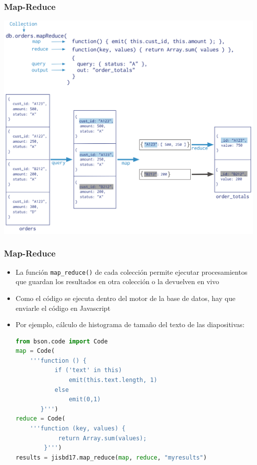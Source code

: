 \documentclass[14pt]{beamer}
\begin{document}
\begin{frame}
\begin{itemize}
\begin{frame}
  \frametitle{Map-Reduce}
  \centering\includegraphics[height=.85\textheight]{img/mongo-map-reduce}
\end{frame}

\begin{frame}
  \frametitle{Map-Reduce}
  \begin{itemize}
  \item La función {\tt map\_reduce()} de cada colección permite ejecutar
    procesamientos que guardan los resultados en otra colección o la
    devuelven en vivo
  \item Como el código se ejecuta dentro del motor de la base de datos, hay
    que enviarle el código en Javascript
  \item Por ejemplo, cálculo de histograma de tamaño del texto de las
    diapositivas:
\framebreak
\begin{lstlisting}[language=Python]
from bson.code import Code
map = Code(
    '''function () {
           if ('text' in this)
               emit(this.text.length, 1)
           else
               emit(0,1)
       }''')
reduce = Code(
    '''function (key, values) {
            return Array.sum(values);
        }''')
results = jisbd17.map_reduce(map, reduce, "myresults")
\end{lstlisting}

  \end{itemize}
\end{frame}



\end{itemize}
\end{frame}
\end{document}

